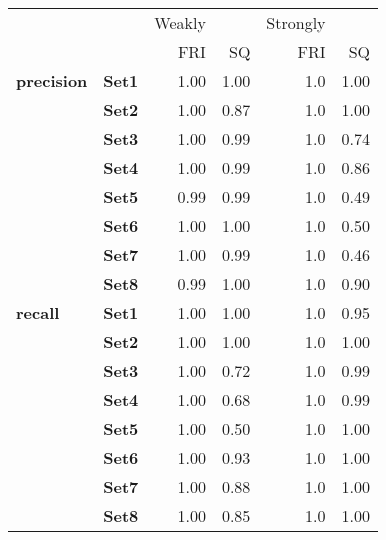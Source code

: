 \begin{tabular}{llrrrr}
\toprule
       &      & Weakly &       & Strongly &       \\
       &      &    FRI &    SQ &      FRI &    SQ \\
\midrule
\textbf{precision} & \textbf{Set1} &   1.00 &  1.00 &      1.0 &  1.00 \\
       & \textbf{Set2} &   1.00 &  0.87 &      1.0 &  1.00 \\
       & \textbf{Set3} &   1.00 &  0.99 &      1.0 &  0.74 \\
       & \textbf{Set4} &   1.00 &  0.99 &      1.0 &  0.86 \\
       & \textbf{Set5} &   0.99 &  0.99 &      1.0 &  0.49 \\
       & \textbf{Set6} &   1.00 &  1.00 &      1.0 &  0.50 \\
       & \textbf{Set7} &   1.00 &  0.99 &      1.0 &  0.46 \\
       & \textbf{Set8} &   0.99 &  1.00 &      1.0 &  0.90 \\
\textbf{recall} & \textbf{Set1} &   1.00 &  1.00 &      1.0 &  0.95 \\
       & \textbf{Set2} &   1.00 &  1.00 &      1.0 &  1.00 \\
       & \textbf{Set3} &   1.00 &  0.72 &      1.0 &  0.99 \\
       & \textbf{Set4} &   1.00 &  0.68 &      1.0 &  0.99 \\
       & \textbf{Set5} &   1.00 &  0.50 &      1.0 &  1.00 \\
       & \textbf{Set6} &   1.00 &  0.93 &      1.0 &  1.00 \\
       & \textbf{Set7} &   1.00 &  0.88 &      1.0 &  1.00 \\
       & \textbf{Set8} &   1.00 &  0.85 &      1.0 &  1.00 \\
\bottomrule
\end{tabular}
